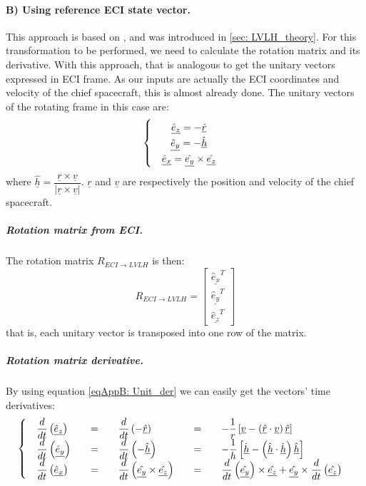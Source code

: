 		\paragraph{B) Using reference ECI state vector. \\}
		 \label{sec:	LVLH_example}
		\indent This approach is based on \cite{LVLH}, and was introduced in \ref{sec:	LVLH_theory}. For this transformation to be performed, we need to calculate the rotation matrix and its derivative. With this approach, that is analogous to get the unitary vectors expressed in ECI frame. As our inputs are actually the ECI coordinates and velocity of the chief spacecraft, this is almost already done. The unitary vectors of the rotating frame in this case are:
		\begin{equation}
		\arraycolsep=10pt
		\def\arraystretch{1.3}
		\left\{ \begin{array}{ccc}
		\underline{\hat{e}_z} = - \underline{\hat{r}} \\
		\underline{\hat{e}_y} = - \underline{\hat{h}} \\		
		\underline{\hat{e}_x} = \underline{\hat{e_y}} \times \underline{\hat{e_z}} 		
		\end{array}\right.
		\end{equation}
		\noindent where $\underline{\hat{h}} = \dfrac{\underline{r} \times\underline{v}}{\lvert \underline{r} \times\underline{v} \rvert}$. $\underline{r}$ and $\underline{v}$ are respectively the position and velocity of the chief spacecraft.
			\subparagraph{Rotation matrix from ECI. \\}
			\indent The rotation matrix $R_{ECI\to LVLH}$ is then:
			\[
			R_{ECI\to LVLH}= \left[ \begin{array}{c}
			\underline{\hat{e}_x}^T \\
			\underline{\hat{e}_y}^T \\
			\underline{\hat{e}_z}^T
			\end{array}\right]
			\]
			\noindent that is, each unitary vector is transposed into one row of the matrix.
			\subparagraph{Rotation matrix derivative. \\}
			\indent By using equation \eqref{eqAppB:	Unit_der} we can easily get the vectors' time derivatives:
			\[
			\arraycolsep=10pt
			\def\arraystretch{1.3}
			\left\{ \begin{array}{lllll}
			\dfrac{d}{dt} \left(\underline{\hat{e}_z}\right) & = & \dfrac{d}{dt} \left(-\underline{\hat{r}}\right) & = & - \dfrac{1}{r} \left[ \underline{v} - \left(\underline{\hat{r}} \cdot \underline{v}\right)\underline{\hat{r}}\right] \\
			\dfrac{d}{dt} \left(\underline{\hat{e}_y}\right) & = & \dfrac{d}{dt} \left(-\underline{\hat{h}}\right) & = & - \dfrac{1}{h} \left[ \underline{\dot{h}} - \left(\underline{\hat{h}} \cdot \underline{\dot{h}}\right)\underline{\hat{h}}\right] \\
			\dfrac{d}{dt} \left(\underline{\hat{e}_x}\right)  & = & \dfrac{d}{dt} \left(\underline{\hat{e_y}}\times \underline{\hat{e_z}}\right) & = & \dfrac{d}{dt} \left(\underline{\hat{e_y}}\right)\times\underline{\hat{e_z}} +  \underline{\hat{e_y}}\times \dfrac{d}{dt} \left(\underline{\hat{e_z}}\right)
			\end{array} \right.
			\]
